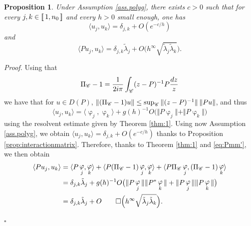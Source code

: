 \documentclass[12pt]{amsart}
\def\<{\langle}
\def\>{\rangle}
\newcommand{\bp}{{\it Proof. }}
\newcommand{\ep}{\hfill $\square$}
\numberwithin{equation}{section}
\numberwithin{figure}{section}
\DeclareMathOperator{\phii}{\varphi}
\newcommand{\vvert}[1]{\left\lVert#1\right\rVert}
\newcommand{\lb}{\operatorname{[\negthinspace [}}
\newcommand{\rb}{\operatorname{]\negthinspace ]}}
\newtheorem{proposition}[defin]{Proposition}
\begin{document}
\begin{proposition}
    Under Assumption \ref{ass.polyg}, there exists $c>0$ such that for every $j,k\in\lb1,n_0\rb$ and every $h>0$ small enough, one has
    \begin{equation}\label{eq:quasiortho}
    \<u_j,u_k\> = \delta_{j,k} + O(e^{-c/h})
    \end{equation}
    and
    \begin{equation}\label{eq:interaction}
    \<Pu_j,u_k\> = \delta_{j,k}\tilde{\lambda}_j + O\Big(h^\infty\sqrt{\tilde{\lambda}_j\tilde{\lambda}_k}\Big).
    \end{equation}
\end{proposition}

\bp Using that
\begin{equation*}
\Pi_{\mathscr C}-1 = \frac{1}{2i\pi}\int_{{\mathscr C}}(z-P)^{-1}P\frac{dz}{z}
\end{equation*}
we have that for $u\in D(P)$, $\vvert{(\Pi_\Cr-1)u}\leq\sup_{\Cr}\Vert(z-P)^{-1}\Vert\vvert{Pu}$, and thus
\begin{equation*}
\<u_j,u_k\> = \<\phii_j,\phii_k\> + g(h)^{-1}O\big(\Vert P\phii_j\Vert + \Vert P\phii_k\Vert\big)
\end{equation*}
using the resolvent estimate given by Theorem \ref{thm:1}. Using now Assumption \ref{ass.polyg}, we obtain $\<u_j,u_k\> = \delta_{j,k} + O(e^{-c/h})$ thanks to Proposition \ref{prop:interactionmatrix}. Therefore, thanks to Theorem \ref{thm:1} and \eqref{eq:Pmm'}, we then %
obtain
\begin{equation*}
\begin{aligned}
    \<Pu_j,u_k\> &= \<P\phii_j,\phii_k\> + \<P(\Pi_\Cr-1)\phii_j,\phii_k\> + \<P\Pi_\Cr\phii_j,(\Pi_\Cr-1)\phii_k\>\\
    &= \delta_{j,k}\tilde{\lambda}_j + g(h)^{-1}O\big(\Vert P\phii_j\Vert\Vert P^*\phii_k\Vert + \Vert P\phii_j\Vert\Vert P\phii_k\Vert\big)\\
    &= \delta_{j,k}\tilde{\lambda}_j + O\qedhere \Big(h^\infty\sqrt{\tilde{\lambda}_{j}\tilde{\lambda}_{k}}\Big).
\end{aligned}
\end{equation*}

\ep
\end{document}
